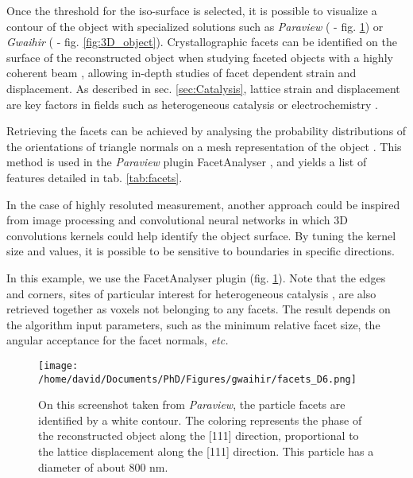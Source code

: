Once the threshold for the iso-surface is selected, it is possible to visualize a contour of the object with specialized solutions such as \textit{Paraview} (\cite{Ahrens2001} - fig. \ref{fig:facets_paraview}) or \textit{Gwaihir} (\cite{Simonne2022} - fig. \ref{fig:3D_object}).
Crystallographic facets can be identified on the surface of the reconstructed object when studying faceted objects with a highly coherent beam \parencite{richard_crystallographic_2018}, allowing in-depth studies of facet dependent strain and displacement.
As described in sec. \ref{sec:Catalysis}, lattice strain and displacement are key factors in fields such as heterogeneous catalysis \parencite{ulvestad_situ_2016,kim_active_2018,fernandez_situ_2019,Passos2020,Carnis2021} or electrochemistry \parencite{vicente_bragg_2021, Atlan2023}.

Retrieving the facets can be achieved by analysing the probability distributions of the orientations of triangle normals on a mesh representation of the object \parencite{Grothausmann2012}.
This method is used in the \textit{Paraview} plugin FacetAnalyser \parencite{GrothausmannBeare2015}, and yields a list of features detailed in tab. \ref{tab:facets}.

In the case of highly resoluted measurement, another approach could be inspired from  image processing and convolutional neural networks in which 3D convolutions kernels could help identify the object surface.
By tuning the kernel size and values, it is possible to be sensitive to boundaries in specific directions.

In this example, we use the FacetAnalyser plugin (fig. \ref{fig:facets_paraview}). Note that the edges and corners, sites of particular interest for heterogeneous catalysis \parencite{Taylor1925}, are also retrieved together as voxels not belonging to any facets.
The result depends on the algorithm input parameters, such as the minimum relative facet size, the angular acceptance for the facet normals, \textit{etc.}

\begin{figure}
    \centering
    \texttt{[image: /home/david/Documents/PhD/Figures/gwaihir/facets\_D6.png]}
    \caption{
    On this screenshot taken from \textit{Paraview}, the particle facets are identified by a white contour.
    The coloring represents the phase of the reconstructed object along the [111] direction, proportional to the lattice displacement along the [111] direction.
    This particle has a diameter of about 800 nm.
    }
    \label{fig:facets_paraview}
\end{figure}

